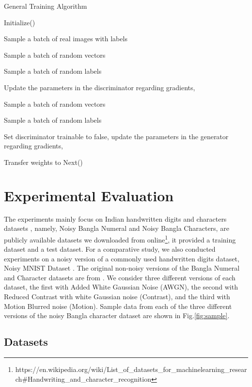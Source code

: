 \documentclass[runningheads]{llncs}
\begin{document}
\begin{algorithm}[t]
\caption{General Training Algorithm} \label{alg1}
{
    Initialize() \par
    {
        {
              Sample a batch of  real images with labels \par
              Sample a batch of  random vectors \par
              Sample a batch of  random labels \par
            Update the parameters in the discriminator regarding gradients,
            
            
              Sample a batch of  random vectors \par
              Sample a batch of  random labels \par
            Set discriminator trainable to false, update the parameters in the generator regarding gradients,
             
            }
    }
    Transfer weights to Next()
}
\end{algorithm}

\section{Experimental Evaluation}\label{exp}
The experiments mainly focus on Indian handwritten digits and characters datasets \cite{Karki18}, namely, Noisy Bangla Numeral and Noisy Bangla Characters, are publicly available datasets we downloaded from online\footnote{https://en.wikipedia.org/wiki/List\_of\_datasets\_for\_machine\-learning\_research\#Handwriting\_and\_character\_recognition}, it provided a training dataset and a test dataset. For a comparative study, we also conducted experiments on a noisy version of a commonly used handwritten digits dataset, Noisy MNIST Dataset \cite{Karki18}. The original non-noisy versions of the Bangla Numeral and Character datasets are from \cite{bhattacharya2009handwritten, bhattacharya2012offline}.  We consider three different versions of each dataset, the first with Added White Gaussian Noise (AWGN),  the second with Reduced Contrast with white Gaussian noise (Contrast), and  the third with Motion Blurred noise (Motion). Sample data from each of the three different versions of the noisy Bangla character dataset are shown in  Fig.\ref{fig:sample}. 


\subsection{Datasets}
\end{document}
